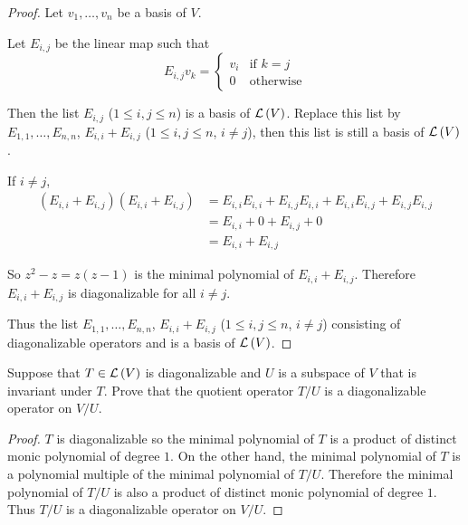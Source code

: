 \begin{proof}
    Let $v_{1}, \ldots, v_{n}$ be a basis of $V$.

    Let $E_{i,j}$ be the linear map such that
    \[
        E_{i,j}v_{k} = \begin{cases}
            v_{i} & \text{if $k = j$} \\
            0     & \text{otherwise}
        \end{cases}
    \]

    Then the list $E_{i,j}$ ($1\leq i, j\leq n$) is a basis of $\mathcal{L}\left({V}\right)$. Replace this list by $E_{1,1}, \ldots, E_{n,n}$, $E_{i,i} + E_{i,j}$ ($1\leq i, j\leq n$, $i\ne j$), then this list is still a basis of $\mathcal{L}\left({V}\right)$.

    If $i\ne j$,
    \begin{align*}
        (E_{i,i} + E_{i,j})(E_{i,i} + E_{i,j}) & = E_{i,i}E_{i,i} + E_{i,j}E_{i,i} + E_{i,i}E_{i,j} + E_{i,j}E_{i,j} \\
                                               & = E_{i,i} + 0 + E_{i,j} + 0                                         \\
                                               & = E_{i,i} + E_{i,j}
    \end{align*}

    So $z^{2} - z = z(z - 1)$ is the minimal polynomial of $E_{i,i} + E_{i,j}$. Therefore $E_{i,i} + E_{i,j}$ is diagonalizable for all $i\ne j$.

    Thus the list $E_{1,1}, \ldots, E_{n,n}$, $E_{i,i} + E_{i,j}$ ($1\leq i, j\leq n$, $i\ne j$) consisting of diagonalizable operators and is a basis of $\mathcal{L}\left({V}\right)$.
\end{proof}
\newpage

\begin{exercise}
    Suppose that $T \in \mathcal{L}\left({V}\right)$ is diagonalizable and $U$ is a subspace of $V$ that is invariant under $T$. Prove that the quotient operator $T/U$ is a diagonalizable operator on $V/U$.
\end{exercise}

\begin{proof}
    $T$ is diagonalizable so the minimal polynomial of $T$ is a product of distinct monic polynomial of degree $1$. On the other hand, the minimal polynomial of $T$ is a polynomial multiple of the minimal polynomial of $T/U$. Therefore the minimal polynomial of $T/U$ is also a product of distinct monic polynomial of degree $1$. Thus $T/U$ is a diagonalizable operator on $V/U$.
\end{proof}
\newpage

